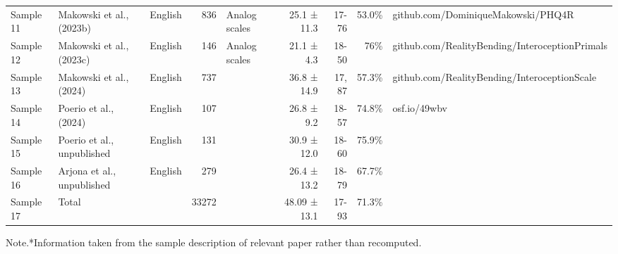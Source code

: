 \begin{table}
\begin{tabular*}{\linewidth}{@{\extracolsep{\fill}}lllrlrrrl}
Sample 11 & Makowski et al., (2023b) & English & 836 & Analog scales & 25.1 ± 11.3 & 17-76 & 53.0\% & github.com/DominiqueMakowski/PHQ4R \\ 
Sample 12 & Makowski et al., (2023c) & English & 146 & Analog scales & 21.1 ± 4.3 & 18-50 & 76\% & github.com/RealityBending/InteroceptionPrimals \\ 
Sample 13 & Makowski et al., (2024) & English & 737 &  & 36.8 ± 14.9 & 17, 87 & 57.3\% & github.com/RealityBending/InteroceptionScale \\ 
Sample 14 & Poerio et al., (2024) & English & 107 &  & 26.8 ± 9.2 & 18-57 & 74.8\% & osf.io/49wbv \\ 
Sample 15 & Poerio et al., unpublished & English & 131 &  & 30.9 ± 12.0 & 18-60 & 75.9\% &  \\ 
Sample 16 & Arjona et al., unpublished & English & 279 &  & 26.4 ± 13.2 & 18-79 & 67.7\% &  \\ 
Sample 17 & Total &  & 33272 &  & 48.09 ± 13.1 & 17-93 & 71.3\% &  \\ 
\bottomrule
\end{tabular*}
\begin{minipage}{\linewidth}
Note.*Information taken from the sample description of relevant paper rather than recomputed.\\
\end{minipage}
\end{table}

